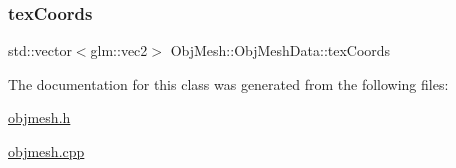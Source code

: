 \mbox{\label{class_obj_mesh_1_1_obj_mesh_data_a0784aa856fa9f3b40aca429ca3f76efc}} 
\subsubsection{\texorpdfstring{texCoords}{texCoords}}
{\footnotesize\ttfamily std\+::vector$<$glm\+::vec2$>$ Obj\+Mesh\+::\+Obj\+Mesh\+Data\+::tex\+Coords}



The documentation for this class was generated from the following files\+:\begin{DoxyCompactItemize}
\item 
\mbox{\hyperlink{objmesh_8h}{objmesh.\+h}}\item 
\mbox{\hyperlink{objmesh_8cpp}{objmesh.\+cpp}}\end{DoxyCompactItemize}
